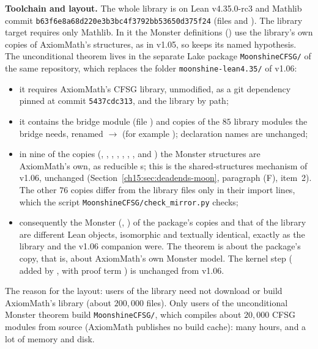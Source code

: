 \begin{status}[title={The release build of v1.1 (Lean v4.35.0-rc3)}]
\textbf{Toolchain and layout.} The whole library is on Lean v4.35.0-rc3 and Mathlib commit
\texttt{b63f6e8a68d220e3b3bc4f3792bb53650d375f24} (files  and ). The
library target  requires only Mathlib. In it the Monster definitions ()
use the library's own copies of AxiomMath's structures, as in v1.05, so 
keeps its named hypothesis. The unconditional theorem lives in the separate Lake package \texttt{MoonshineCFSG/} of the
same repository, which replaces the folder \texttt{moonshine-lean4.35/} of v1.06:
\begin{itemize}
\item it requires AxiomMath's CFSG library, unmodified, as a git dependency pinned at commit \texttt{5437cdc313}, and the
  library  by path;
\item it contains the bridge module  (file
  ) and copies of the $85$ library modules the bridge
  needs, renamed  $\to$  (for example
  ); declaration names are unchanged;
\item in nine of the copies (, , , ,
  , , ,  and )
  the Monster structures are AxiomMath's own, as reducible s; this is the shared-structures mechanism of
  v1.06, unchanged (Section~\ref{ch15:sec:deadends-moon}, paragraph (F), item~2). The other $76$ copies differ from the
  library files only in their import lines, which the script \texttt{MoonshineCFSG/check\_mirror.py} checks;
\item consequently the Monster (, ) of the package's copies and that of the library are
  different Lean objects, isomorphic and textually identical, exactly as the library and the v1.06 companion were. The
  theorem  is about the package's copy, that is, about
  AxiomMath's own Monster model. The kernel step ( added by , with proof term
  ) is unchanged from v1.06.
\end{itemize}
The reason for the layout: users of the library need not download or build AxiomMath's library (about $200{,}000$
files). Only users of the unconditional Monster theorem build \texttt{MoonshineCFSG/}, which compiles about $20{,}000$
CFSG modules from source (AxiomMath publishes no build cache): many hours, and a lot of memory and disk.


\end{status}
